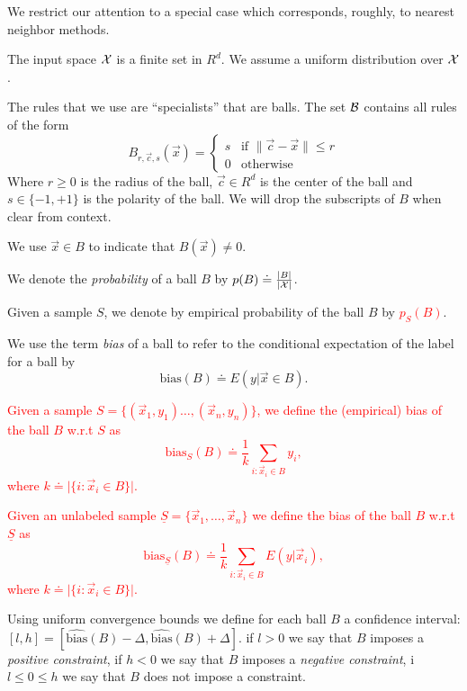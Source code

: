 \documentclass{article}
\newcommand{\X}{{\cal X}}
\newcommand{\B}{{\cal B}}
\newcommand{\x}{\vec{x}}
\newcommand{\cc}{\vec{c}}
\newcommand{\bias}{\text{bias}}
\newcommand{\ebias}{\widehat{\text{bias}}}
\newcommand{\samp}{S}
\newcommand{\usamp}{\underline{S}}
\newcommand{\new}[1]{\textcolor{red}{#1}}
\begin{document}
We restrict our attention to a special case which corresponds,
roughly, to nearest neighbor methods.
\begin{enumerate}
\item The input space $\X$ is a finite set in $R^d$. We assume a
  uniform distribution over $\X$.
  \item
    The rules that we use are ``specialists'' that are balls. The set
    $\B$ contains all rules of the form
    \[
    B_{r,\cc,s}(\x) =
    \begin{cases}
      s & \text{if } \| \cc- \x \| \leq r \\
    0 & \text{otherwise }
    \end{cases}
    \]
    Where $r \geq 0$ is the radius of the ball, $\cc \in R^d$ is the
    center of the ball and $s \in \{-1,+1\}$ is the polarity of the ball.
    We will drop the subscripts of $B$ when clear from context.
  \item
    We use $\x \in B$ to indicate that $B(\x) \neq 0$.
  \item
    We denote the {\em probability} of a ball $B$ by $p(B) \doteq
    \frac{|B|}{|\X|}$.
  \item Given a sample $\samp$, we denote by empirical probability of the ball $B$ by \new{$p_{\samp}(B)$}.
  \item
    We use the term {\em bias} of a ball to refer to the conditional
    expectation of the label for a ball by
    \[
    \bias(B) \doteq E\left( y|\x \in B \right).
    \]
  \item \new{Given a sample $\samp=\{(\x_1,y_1)\ldots,(\x_n,y_n)\}$, 
  we define the (empirical) bias of the ball $B$ w.r.t $\samp$ as 
  \[
  \bias_{\samp}(B) \doteq \frac{1}{k}\sum_{i:\x_i\in B}{y_i},
  \]
  where $k \doteq \lvert\{ i : \x_i\in B\}\rvert$.
  \item Given an unlabeled sample $\usamp=\{\x_1,\ldots,\x_n\}$
  we define the bias of the ball $B$ w.r.t $\usamp$ as 
  \[
  \bias_{\usamp}(B) \doteq \frac{1}{k}\sum_{i:\x_i\in B}{E\left( y|\x_i\right)},
  \]
  where $k \doteq \lvert\{ i : \x_i\in B\}\rvert$.}
  \item Using uniform convergence bounds we define for each ball $B$
    a confidence interval:
    $[l,h]=[\ebias(B)-\Delta,\ebias(B)+\Delta]$.
    if $l>0$ we say that $B$ imposes a {\em positive constraint}, if
    $h<0$ we say that $B$ imposes a {\em negative constraint}, i
    $l\leq 0 \leq h$ we say that $B$ does not impose a constraint.
\end{enumerate}
\end{document}
